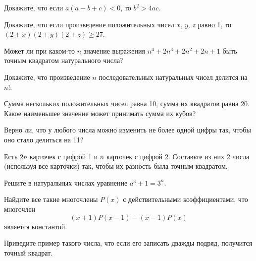 \resetproblem \begingroup %
    \def\jeolmdate{28 ноября 2018 г.}%
\jeolmheader \endgroup


\begin{problems}

\item Докажите, что если $a(a-b+c)<0$, то $b^2>4ac$.

\item Докажите, что если произведение положительных чисел $x$, $y$, $z$ равно 1, то $(2+x)(2+y)(2+z) \geqslant 27$.

\item Может ли при каком-то $n$ значение выражения $n^4 + 2n^3 + 2n^2 + 2n + 1$ быть точным квадратом натурального числа?

\item Докажите, что произведение $n$ последовательных натуральных чисел делится на $n!$.

\item Сумма нескольких положительных чисел равна 10, сумма их квадратов равна 20. Какое наименьшее значение может принимать сумма их кубов?


\item Верно ли, что у любого числа можно изменить не более одной цифры так, чтобы оно стало делиться на 11?

\item Есть $2n$ карточек с цифрой 1 и $n$ карточек с цифрой 2. Составьте из них 2 числа (используя все карточки) так, чтобы их разность была точным квадратом.

\item Решите в натуральных числах уравнение $a^3 + 1 = 3^n$.

\item Найдите все такие многочлены $P(x)$ с действительными коэффициентами, что многочлен $$(x+1) P(x-1) - (x-1)P(x)$$ является константой.


\item Приведите пример такого числа, что если его записать дважды подряд, получится точный квадрат.





\end{problems}